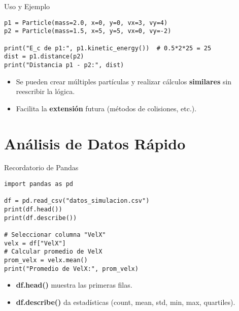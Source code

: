 \documentclass[10pt]{beamer}
\begin{document}
\begin{frame}[fragile]{Uso y Ejemplo}
\begin{verbatim}
p1 = Particle(mass=2.0, x=0, y=0, vx=3, vy=4)
p2 = Particle(mass=1.5, x=5, y=5, vx=0, vy=-2)

print("E_c de p1:", p1.kinetic_energy())  # 0.5*2*25 = 25
dist = p1.distance(p2)
print("Distancia p1 - p2:", dist)
\end{verbatim}
\begin{itemize}
  \item Se pueden crear múltiples partículas y realizar cálculos \textbf{similares} sin reescribir la lógica.
  \item Facilita la \textbf{extensión} futura (métodos de colisiones, etc.).
\end{itemize}
\end{frame}

\section{Análisis de Datos Rápido}

\begin{frame}[fragile]{Recordatorio de Pandas}
\begin{verbatim}
import pandas as pd

df = pd.read_csv("datos_simulacion.csv")
print(df.head())
print(df.describe())

# Seleccionar columna "VelX"
velx = df["VelX"]
# Calcular promedio de VelX
prom_velx = velx.mean()
print("Promedio de VelX:", prom_velx)
\end{verbatim}
\begin{itemize}
  \item \textbf{df.head()} muestra las primeras filas.
  \item \textbf{df.describe()} da estadísticas (count, mean, std, min, max, quartiles).
\end{itemize}
\end{frame}
\end{document}
